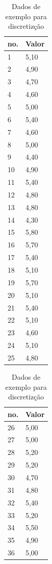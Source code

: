 \begin{table}[!ht]
\centering
\caption{Dados de exemplo para discretizção}
\label{tab:discretizaco}
\begin{tabular}{|ll|}
\hline 
 no. & Valor \\ \hline
1	&	5,10	\\ \hline
2	&	4,90	\\ \hline
3	&	4,70	\\ \hline
4	&	4,60	\\ \hline
5	&	5,00	\\ \hline
6	&	5,40	\\ \hline
7	&	4,60	\\ \hline
8	&	5,00	\\ \hline
9	&	4,40	\\ \hline
10	&	4,90	\\ \hline
11	&	5,40	\\ \hline
12	&	4,80	\\ \hline
13	&	4,80	\\ \hline
14	&	4,30	\\ \hline
15	&	5,80	\\ \hline
16	&	5,70	\\ \hline
17	&	5,40	\\ \hline
18	&	5,10	\\ \hline
19	&	5,70	\\ \hline
20	&	5,10	\\ \hline
21	&	5,40	\\ \hline
22	&	5,10	\\ \hline
23	&	4,60	\\ \hline
24	&	5,10	\\ \hline
25	&	4,80	\\ \hline
\end{tabular}
\begin{tabular}{ |ll| }
\hline
 no. & Valor \\ \hline
26	&	5,00	\\ \hline
27	&	5,00	\\ \hline
28	&	5,20	\\ \hline
29	&	5,20	\\ \hline
30	&	4,70	\\ \hline
31	&	4,80	\\ \hline
32	&	5,40	\\ \hline
33	&	5,20	\\ \hline
34	&	5,50	\\ \hline
35	&	4,90	\\ \hline
36	&	5,00	\\ \hline

\end{tabular}
\end{table}
